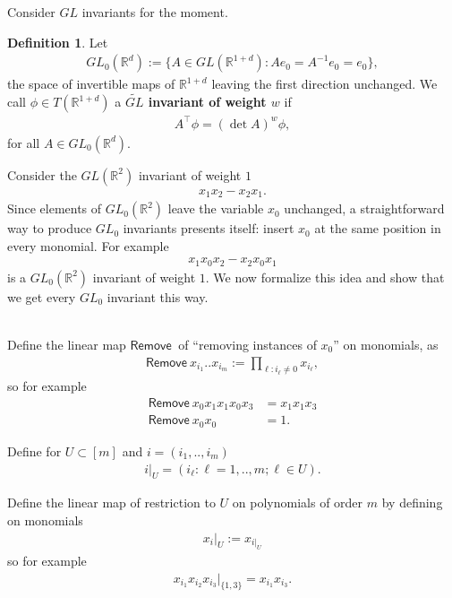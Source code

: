 \documentclass{scrartcl}
\theoremstyle{plain}
\theoremstyle{definition}
\newtheorem{definition}[theorem]{Definition}
\newcommand{\R}{\mathbb{R}}
\newcommand{\1}[1]{1_{\{#1\}}}
\newcommand{\ds}{d} %
\begin{document}
Consider $GL$ invariants for the moment.
\begin{definition}
  Let
  \begin{align*}
    GL_0(\R^\ds) := \{ A \in GL(\R^{1+\ds}) : A e_0 = A^{-1} e_0 = e_0 \},
  \end{align*}
  the space of invertible maps of $\R^{1+\ds}$ leaving the first direction unchanged.
  We call $\phi \in T(\R^{1+\ds})$ a \textbf{$\widetilde{GL}$ invariant of weight $w$} if
  \begin{align*}
    A^\top \phi = (\det A)^w \phi,
  \end{align*}
  for all $A \in GL_0(\R^\ds)$.
\end{definition}

Consider the $GL(\R^2)$ invariant of weight $1$
\begin{align*}
  x_1 x_2 - x_2 x_1.
\end{align*}
Since elements of $GL_0(\R^2)$ leave the variable $x_0$ unchanged,
a straightforward way to produce $GL_0$ invariants presents itself:
insert $x_0$ at the same position in every monomial.
For example
\begin{align*}
  x_1 x_0 x_2 - x_2 x_0 x_1
\end{align*}
is a $GL_0(\R^2)$ invariant of weight $1$.
We now formalize this idea and show that we get every $GL_0$ invariant this way.

~\\

\newcommand{\ins}{\mathsf{Insert}}
\newcommand{\remove}{\mathsf{Remove\ }}
Define the linear map $\remove$ of ``removing instances of $x_0$'' on monomials, as
\begin{align*}
  \remove x_{i_1} .. x_{i_m} := \prod_{\ell : i_\ell \not= 0} x_{i_\ell},
\end{align*}
so for example
\begin{align*}
  \remove x_0 x_1 x_1 x_0 x_3 &= x_1 x_1 x_3 \\
  \remove x_0 x_0 &= 1.
\end{align*}

Define for $U \subset [m]$ and $i = (i_1, .., i_m)$
\begin{align*}
  i|_U = (i_\ell : \ell = 1,.., m; \ell \in U).
\end{align*}

Define the linear map of restriction to $U$
on polynomials of order $m$ by defining on monomials
\begin{align*}
  x_i|_U := x_{i|_U}
\end{align*}
so for example
\begin{align*}
  x_{i_1} x_{i_2} x_{i_3} |_{\{1,3\}} = x_{i_1} x_{i_3}.
\end{align*}
\end{document}
